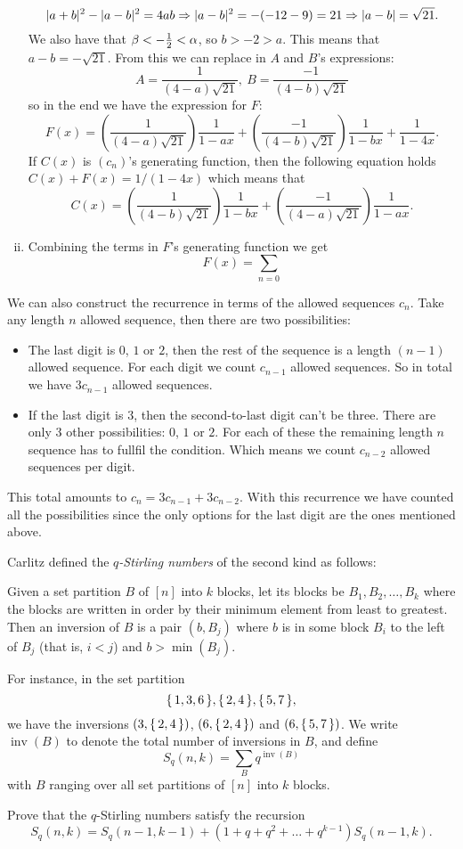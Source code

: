 \documentclass[12pt]{memoir}
\DeclareMathOperator{\inv}{inv}
\begin{document}
\begin{ptcbr}
\begin{enumerate}[i)]
$$|a+b|^2-|a-b|^2=4ab\Rightarrow|a-b|^2=-(-12-9)=21\Rightarrow|a-b|=\sqrt{21}.$$
We also have that $\beta<-\frac{1}{2}<\alpha$, so $b>-2>a$. This means that $a-b=-\sqrt{21}$. From this we can replace in $A$ and $B$'s expressions:
$$A=\frac{1}{(4-a)\sqrt{21}},\ B=\frac{-1}{(4-b)\sqrt{21}}$$
so in the end we have the expression for $F$:
$$F(x)=\left(\frac{1}{(4-a)\sqrt{21}}\right)\frac{1}{1-ax}+\left(\frac{-1}{(4-b)\sqrt{21}}\right)\frac{1}{1-bx}+\frac{1}{1-4x}.$$
If $C(x)$ is $(c_n)$'s generating function, then the following equation holds $C(x)+F(x)=1/(1-4x)$ which means that
$$C(x)=\left(\frac{1}{(4-b)\sqrt{21}}\right)\frac{1}{1-bx}
+\left(\frac{-1}{(4-a)\sqrt{21}}\right)\frac{1}{1-ax}.$$
\item Combining the terms in $F$'s generating function we get 
$$F(x)=\sum_{n=0}$$
\end{enumerate}
\end{ptcbr}

\begin{ptcb}
   We can also construct the recurrence in terms of the allowed sequences $c_n$. Take any length $n$ allowed sequence, then there are two possibilities:
   \begin{itemize}
      \itemsep=-0.4em
      \item The last digit is $0$, $1$ or $2$, then the rest of the sequence is a length $(n-1)$ allowed sequence. For each digit we count $c_{n-1}$ allowed sequences. So in total we have $3c_{n-1}$ allowed sequences.
      \item If the last digit is $3$, then the second-to-last digit can't be three. There are only $3$ other possibilities: $0$, $1$ or $2$. For each of these the remaining length $n$ sequence has to fullfil the condition. Which means we count $c_{n-2}$ allowed sequences per digit.
   \end{itemize}
   This total amounts to $c_n=3c_{n-1}+3c_{n-2}$. With this recurrence we have counted all the possibilities since the only options for the last digit are the ones mentioned above. 
\end{ptcb}

\begin{Ej}[Exercise 5]
Carlitz defined the \emph{$q$-Stirling numbers} of the second kind as follows:
\par
Given a set partition $B$ of $[n]$ into $k$ blocks, let its blocks be $B_1,B_2,\dots,B_k$ where the blocks are written in order by their minimum element from least to greatest. Then an inversion of $B$ is a pair $(b, B_j )$ where $b$ is in some block $B_i$ to the left of $B_j$ (that is, $i < j$) and $b > \min(B_j )$.\par 
For instance, in the set partition
$$\{\,1,3,6\,\},\{\,2,4\,\},\{\,5,7\,\},$$
we have the inversions $(3,\{\,2,4\,\})$, $(6,\{\,2,4\,\})$ and $(6,\{\,5,7\,\})$. We write $\inv(B)$ to denote the total number of inversions in $B$, and define 
$$S_q(n,k)=\sum_Bq^{\inv(B)}$$
with $B$ ranging over all set partitions of $[n]$ into $k$ blocks.\par 
Prove that the $q$-Stirling numbers satisfy the recursion
$$S_q(n,k)=S_q(n-1,k-1)+(1+q+q^2+\dots+q^{k-1})S_q(n-1,k).$$
\end{Ej}
\end{document}
